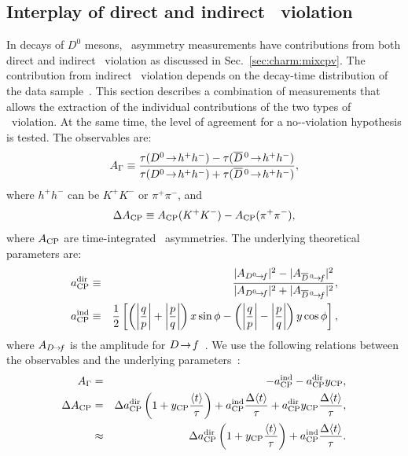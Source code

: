 \subsection{Interplay of direct and indirect \cp\ violation}
\label{sec:charm:cpvdir}

In decays of $D^0$ mesons, \cp\ asymmetry measurements have contributions from 
both direct and indirect \cp\ violation as discussed in Sec.~\ref{sec:charm:mixcpv}.
The contribution from indirect \cp\ violation depends on the decay-time distribution 
of the data sample~\cite{Kagan:2009gb}. This section describes a combination of 
measurements that allows the extraction of the individual contributions of the 
two types of \cp\ violation.
At the same time, the level of agreement for a no-\cp-violation hypothesis is 
tested. The observables are: 
\begin{equation}
A_{\Gamma} \equiv \frac{\tau(D^0 \ra h^+ h^-) - \tau(\dbar \ra h^+ h^- )}
{\tau(D^0 \ra h^+ h^-) + \tau(\dbar \ra h^+ h^- )},
\end{equation}
where $h^+ h^-$ can be $K^+ K^-$ or $\pi^+\pi^-$, and 
\begin{equation}
\Delta A_{\rm CP}   \equiv A_{\rm CP}(K^+K^-) - A_{\rm CP}(\pi^+\pi^-),
\end{equation}
where $A_{\rm CP}$ are time-integrated \cp\ asymmetries. The underlying 
theoretical parameters are: 
\begin{eqnarray}
a_{\rm CP}^{\rm dir} & \equiv & \frac{|A_{D^0\ra f} |^2 - |A_{\dbar\ra f} |^2} 
{|A_{D^0\ra f} |^2 + |A_{\dbar\ra f} |^2} ,\nonumber\\ 
a_{\rm CP}^{\rm ind}  & \equiv & \frac{1}{2} 
\left[ \left(\left|\frac{q}{p}\right| + \left|\frac{p}{q}\right|\right) x \sin \phi - 
\left(\left|\frac{q}{p}\right| - \left|\frac{p}{q}\right|\right) y \cos \phi \right] ,
\end{eqnarray}
where $A_{D\!\rightarrow\! f}$ is the amplitude for $D\!\rightarrow\! f$~\cite{Grossman:2006jg}. 
We use the following relations 
between the observables and the underlying parameters~\cite{Gersabeck:2011xj}: 
\begin{eqnarray}
A_{\Gamma} & = & - a_{\rm CP}^{\rm ind} - a_{\rm CP}^{\rm dir} y_{\rm CP},\nonumber\\ 
\Delta A_{\rm CP} & = &  \Delta a_{\rm CP}^{\rm dir} \left(1 + y_{\rm CP} 
\frac{\langle t\rangle}{\tau} \right)   +   
   a_{\rm CP}^{\rm ind} \frac{\Delta\langle t\rangle}{\tau}   +   
  a_{\rm CP}^{\rm dir} y_{\rm CP} \frac{\Delta\langle t\rangle}{\tau},\\ 
& \approx & \Delta a_{\rm CP}^{\rm dir} \left(1 + y_{\rm CP} 
\frac{\langle t\rangle}{\tau} \right)   +   a_{\rm CP}^{\rm ind} 
\frac{\Delta\langle t\rangle}{\tau}.
\end{eqnarray}
